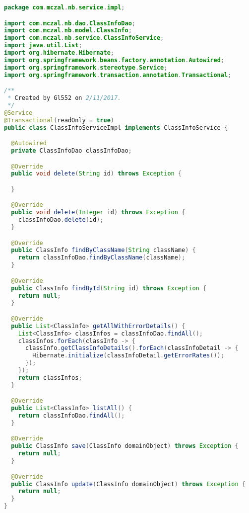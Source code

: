 \begin{lstlisting}[language=Java,basicstyle=\tiny,caption=ClassInfoServiceImpl.java]
package com.mczal.nb.service.impl;

import com.mczal.nb.dao.ClassInfoDao;
import com.mczal.nb.model.ClassInfo;
import com.mczal.nb.service.ClassInfoService;
import java.util.List;
import org.hibernate.Hibernate;
import org.springframework.beans.factory.annotation.Autowired;
import org.springframework.stereotype.Service;
import org.springframework.transaction.annotation.Transactional;

/**
 * Created by Gl552 on 2/11/2017.
 */
@Service
@Transactional(readOnly = true)
public class ClassInfoServiceImpl implements ClassInfoService {

  @Autowired
  private ClassInfoDao classInfoDao;

  @Override
  public void delete(String id) throws Exception {

  }

  @Override
  public void delete(Integer id) throws Exception {
    classInfoDao.delete(id);
  }

  @Override
  public ClassInfo findByClassName(String className) {
    return classInfoDao.findByClassName(className);
  }

  @Override
  public ClassInfo findById(String id) throws Exception {
    return null;
  }

  @Override
  public List<ClassInfo> getAllWithErrorDetails() {
    List<ClassInfo> classInfos = classInfoDao.findAll();
    classInfos.forEach(classInfo -> {
      classInfo.getClassInfoDetails().forEach(classInfoDetail -> {
        Hibernate.initialize(classInfoDetail.getErrorRates());
      });
    });
    return classInfos;
  }

  @Override
  public List<ClassInfo> listAll() {
    return classInfoDao.findAll();
  }

  @Override
  public ClassInfo save(ClassInfo domainObject) throws Exception {
    return null;
  }

  @Override
  public ClassInfo update(ClassInfo domainObject) throws Exception {
    return null;
  }
}

\end{lstlisting}


